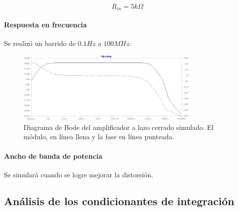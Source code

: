\documentclass[a4paper,12pt,twoside]{article}
\begin{document}
\[R_{in}=5k\Omega\]


\paragraph{Respuesta en frecuencia} 

Se realizó un barrido de $0.1Hz$ a $100MHz$.

\begin{figure}[H]
	\centering
	\includegraphics[width=0.8\textwidth]{img/sim/bode}
	\caption{Diagrama de Bode del amplificador a lazo cerrado simulado. El módulo, en línea llena y la fase en línea punteada.}
	\label{fig:bode}
\end{figure}




\paragraph{Ancho de banda de potencia}

Se simulará cuando se logre mejorar la distorsión.


\subsection{Análisis de los condicionantes de integración}








\end{document}

